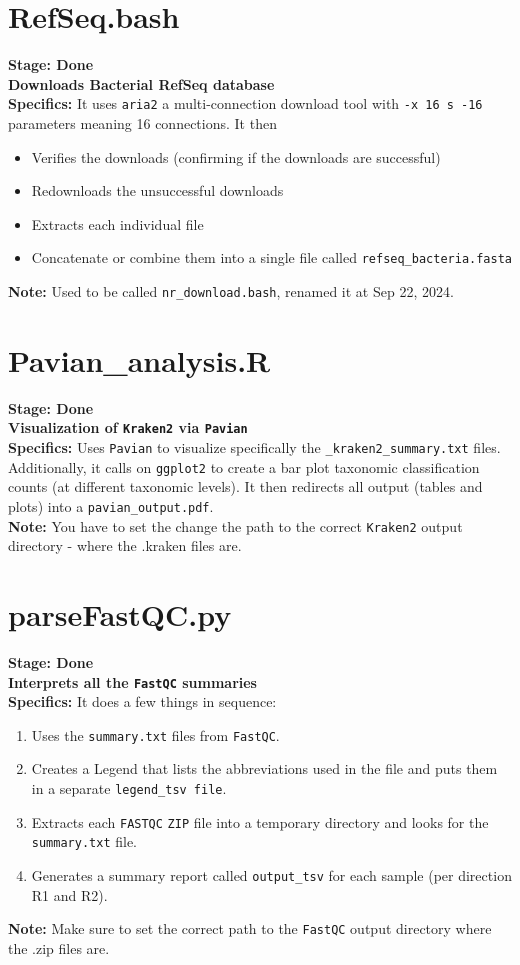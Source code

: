 \documentclass[11pt]{report}
\begin{document}
{\section{RefSeq.bash}
\textbf{Stage: Done} \\   
\textbf{Downloads \textbf{Bacterial} RefSeq database} \\
\textbf{Specifics:} It uses \texttt{aria2} a multi-connection download tool with \texttt{-x 16 s -16} parameters meaning 16 connections. It then 
	\begin{itemize}
		\item Verifies the downloads (confirming if the downloads are successful)
		\item Redownloads the unsuccessful downloads
		\item Extracts each individual file
		\item Concatenate or combine them into a single file called \texttt{refseq\_bacteria.fasta}
	\end{itemize}    
\textbf{Note:} Used to be called \texttt{nr\_download.bash}, renamed it at Sep 22, 2024. 

\linenumbers*
\section{Pavian\_analysis.R}
\textbf{Stage: Done} \\   
\textbf{Visualization of \texttt{Kraken2} via \texttt{Pavian}} \\
\textbf{Specifics:} Uses \texttt{Pavian} to visualize specifically the \texttt{\_kraken2\_summary.txt} files. Additionally, it calls on \texttt{ggplot2} to create a bar plot taxonomic classification counts (at different taxonomic levels). It then redirects all output (tables and plots) into a \texttt{pavian\_output.pdf}. \\
\textbf{Note:} You have to set the change the path to the correct \texttt{Kraken2} output directory - where the .kraken files are. 

\linenumbers*
\section{parseFastQC.py}
\textbf{Stage: Done} \\   
\textbf{Interprets all the \texttt{FastQC} summaries} \\
\textbf{Specifics:} It does a few things in sequence:
\begin{enumerate}
	\item Uses the \texttt{summary.txt} files from \texttt{FastQC}. 
	\item Creates a Legend that lists the abbreviations used in the file and puts them in a separate \texttt{legend\_tsv file}. 
	\item Extracts each \texttt{FASTQC} \texttt{ZIP} file into a temporary directory and looks for the \texttt{summary.txt} file.
	\item Generates a summary report called \texttt{output\_tsv} for each sample (per direction R1 and R2). 
\end{enumerate}
\textbf{Note:} Make sure to set the correct path to the \texttt{FastQC} output directory where the .zip files are. 

}
\end{document}
